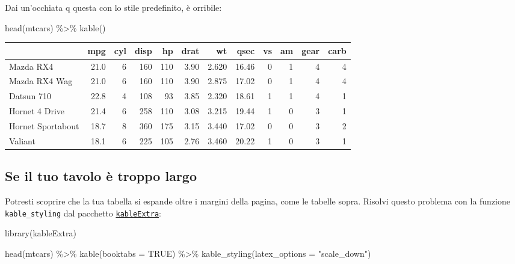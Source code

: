 \documentclass[a4paper, 11pt, nobind]{templates/ociamthesis}
\newenvironment{Shaded}{\begin{snugshade}}{\end{snugshade}}
\newcommand{\AttributeTok}[1]{\textcolor[rgb]{0.77,0.63,0.00}{#1}}
\newcommand{\ConstantTok}[1]{\textcolor[rgb]{0.00,0.00,0.00}{#1}}
\newcommand{\FunctionTok}[1]{\textcolor[rgb]{0.00,0.00,0.00}{#1}}
\newcommand{\NormalTok}[1]{#1}
\newcommand{\SpecialCharTok}[1]{\textcolor[rgb]{0.00,0.00,0.00}{#1}}
\newcommand{\StringTok}[1]{\textcolor[rgb]{0.31,0.60,0.02}{#1}}
\renewenvironment{Shaded}
{
  \vspace{10pt}%
  \begin{snugshade}%
}{%
  \end{snugshade}%
  \vspace{8pt}%
}
\begin{document}
\vspace{4mm}

Dai un'occhiata q questa con lo stile predefinito, è orribile:

\begin{Shaded}
\begin{Highlighting}[]
\FunctionTok{head}\NormalTok{(mtcars) }\SpecialCharTok{\%\textgreater{}\%} 
  \FunctionTok{kable}\NormalTok{()}
\end{Highlighting}
\end{Shaded}

\begin{tabular}{l|r|r|r|r|r|r|r|r|r|r|r}
\hline
  & mpg & cyl & disp & hp & drat & wt & qsec & vs & am & gear & carb\\
\hline
Mazda RX4 & 21.0 & 6 & 160 & 110 & 3.90 & 2.620 & 16.46 & 0 & 1 & 4 & 4\\
\hline
Mazda RX4 Wag & 21.0 & 6 & 160 & 110 & 3.90 & 2.875 & 17.02 & 0 & 1 & 4 & 4\\
\hline
Datsun 710 & 22.8 & 4 & 108 & 93 & 3.85 & 2.320 & 18.61 & 1 & 1 & 4 & 1\\
\hline
Hornet 4 Drive & 21.4 & 6 & 258 & 110 & 3.08 & 3.215 & 19.44 & 1 & 0 & 3 & 1\\
\hline
Hornet Sportabout & 18.7 & 8 & 360 & 175 & 3.15 & 3.440 & 17.02 & 0 & 0 & 3 & 2\\
\hline
Valiant & 18.1 & 6 & 225 & 105 & 2.76 & 3.460 & 20.22 & 1 & 0 & 3 & 1\\
\hline
\end{tabular}

\hypertarget{se-il-tuo-tavolo-uxe8-troppo-largo}{%
\subsection{Se il tuo tavolo è troppo largo}\label{se-il-tuo-tavolo-uxe8-troppo-largo}}

Potresti scoprire che la tua tabella si espande oltre i margini della pagina, come le tabelle sopra.
Risolvi questo problema con la funzione \texttt{kable\_styling} dal pacchetto \href{https://haozhu233.github.io/kableExtra/}{\texttt{kableExtra}}:

\begin{Shaded}
\begin{Highlighting}[]
\FunctionTok{library}\NormalTok{(kableExtra)}

\FunctionTok{head}\NormalTok{(mtcars) }\SpecialCharTok{\%\textgreater{}\%} 
  \FunctionTok{kable}\NormalTok{(}\AttributeTok{booktabs =} \ConstantTok{TRUE}\NormalTok{) }\SpecialCharTok{\%\textgreater{}\%} 
  \FunctionTok{kable\_styling}\NormalTok{(}\AttributeTok{latex\_options =} \StringTok{"scale\_down"}\NormalTok{)}
\end{Highlighting}
\end{Shaded}
\end{document}
